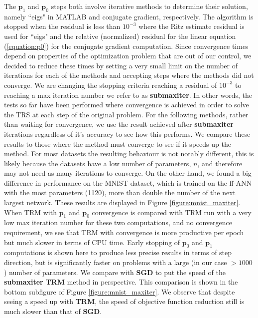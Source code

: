 \documentclass[letterpaper,12pt,titlepage,oneside,final]{book}
\begin{document}
	The $\mathbf{p}_{1}$ and $\mathbf{p}_{0}$ steps both involve iterative methods to determine their solution, namely ``eigs" in MATLAB and conjugate gradient, respectively. The algorithm is stopped when the residual is less than $10^{-3}$ where the Ritz estimate residual is used for ``eigs" and the relative (normalized) residual for the linear equation (\ref{equation:p0}) for the conjugate gradient computation. Since convergence times depend on properties of the optimization problem that are out of our control, we decided to reduce these times by setting a very small limit on the number of iterations for each of the methods and accepting steps where the methods did not converge. We are changing the stopping criteria reaching a residual of $10^{-3}$ to reaching a max iteration number we refer to as \textbf{submaxiter}. In other words, the tests so far have been performed where convergence is achieved in order to solve the TRS at each step of the original problem. For the following methods, rather than waiting for convergence, we use the result achieved after \textbf{submaxiter} iterations regardless of it's accuracy to see how this performs. We compare these results to those where the method must converge to see if it speeds up the method. For most datasets the resulting behaviour is not notably different, this is likely because the datasets have a low number of parameters, $n$, and therefore may not need as many iterations to converge. On the other hand, we found a big difference in performance on the MNIST dataset, which is trained on the ff-ANN with the most parameters (1120), more than double the number of the next largest network. These results are displayed in Figure \ref{figure:mnist_maxiter}. When TRM with $\mathbf{p}_{1}$ and $\mathbf{p}_{0}$ convergence is compared with TRM run with a very low max iteration number for these two computations, and no convergence requirement, we see that TRM with convergence is more productive per epoch but much slower in terms of CPU time. Early stopping of $\mathbf{p}_{0}$ and $\mathbf{p}_{1}$ computations is shown here to produce less precise results in terms of step direction, but is significantly faster on problems with a large (in our case $>1000$) number of parameters. We compare with \textbf{SGD} to put the speed of the \textbf{submaxiter} \textbf{TRM} method in perspective. This comparison is shown in the bottom subfigure of Figure \ref{figure:mnist_maxiter}. We observe that despite seeing a speed up with \textbf{TRM}, the speed of objective function reduction still is much slower than that of \textbf{SGD}.
	
\end{document}
